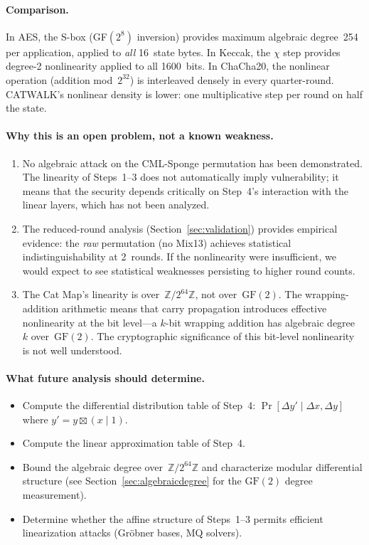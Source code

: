\documentclass[runningheads]{llncs}
\newcommand{\Ztwo}{\mathbb{Z}/2^{64}\mathbb{Z}}
\begin{document}
\paragraph{Comparison.}
In AES, the S-box (GF$(2^8)$ inversion) provides maximum algebraic degree~254
per application, applied to \emph{all} 16~state bytes.  In Keccak, the $\chi$
step provides degree-2 nonlinearity applied to all 1600~bits.  In ChaCha20,
the nonlinear operation (addition mod~$2^{32}$) is interleaved densely in every
quarter-round.  CATWALK's nonlinear density is lower: one multiplicative step
per round on half the state.

\paragraph{Why this is an open problem, not a known weakness.}
\begin{enumerate}[nosep]
\item No algebraic attack on the CML-Sponge permutation has been demonstrated.
  The linearity of Steps~1--3 does not automatically imply vulnerability;
  it means that the security depends critically on Step~4's interaction with
  the linear layers, which has not been analyzed.
\item The reduced-round analysis (Section~\ref{sec:validation}) provides
  empirical evidence: the \emph{raw} permutation (no Mix13) achieves
  statistical indistinguishability at 2~rounds.  If the nonlinearity were
  insufficient, we would expect to see statistical weaknesses persisting
  to higher round counts.
\item The Cat Map's linearity is over~$\Ztwo$, not over~$\mathrm{GF}(2)$.
  The wrapping-addition arithmetic means that carry propagation introduces
  effective nonlinearity at the bit level---a $k$-bit wrapping addition has
  algebraic degree~$k$ over~$\mathrm{GF}(2)$.  The cryptographic significance
  of this bit-level nonlinearity is not well understood.
\end{enumerate}

\paragraph{What future analysis should determine.}
\begin{itemize}[nosep]
\item Compute the differential distribution table of Step~4:
  $\Pr[\Delta y' \mid \Delta x, \Delta y]$ where $y' = y \boxtimes (x \mathbin{|} 1)$.
\item Compute the linear approximation table of Step~4.
\item Bound the algebraic degree over~$\Ztwo$ and characterize modular
  differential structure (see Section~\ref{sec:algebraicdegree} for the
  $\mathrm{GF}(2)$ degree measurement).
\item Determine whether the affine structure of Steps~1--3 permits efficient
  linearization attacks (Gr\"obner bases, MQ solvers).
\end{itemize}
\end{document}
